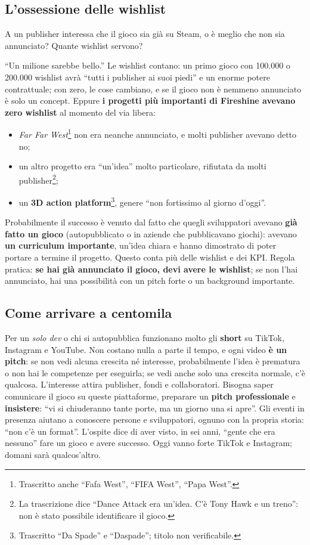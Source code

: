 \subsection{L'ossessione delle wishlist}

A un publisher interessa che il gioco sia già su Steam, o è meglio che non sia
annunciato? Quante wishlist servono?

``Un milione sarebbe bello.'' Le wishlist contano: un primo gioco con 100.000 o
200.000 wishlist avrà ``tutti i publisher ai suoi piedi'' e un enorme potere
contrattuale; con zero, le cose cambiano, e se il gioco non è nemmeno annunciato è
solo un concept. Eppure \textbf{i progetti più importanti di Fireshine avevano zero
wishlist} al momento del via libera:
\begin{itemize}
  \item \emph{Far Far West}\footnote{Trascritto anche ``Fafa West'', ``FIFA
        West'', ``Papa West''.} non era neanche annunciato, e molti publisher
        avevano detto no;
  \item un altro progetto era ``un'idea'' molto particolare, rifiutata da molti
        publisher\footnote{La trascrizione dice ``Dance Attack era un'idea. C'è Tony
        Hawk e un treno'': non è stato possibile identificare il gioco.};
  \item un \textbf{3D action platform}\footnote{Trascritto ``Da Spade'' e
        ``Daspade''; titolo non verificabile.}, genere ``non fortissimo al giorno
        d'oggi''.
\end{itemize}
Probabilmente il successo è venuto dal fatto che quegli sviluppatori avevano
\textbf{già fatto un gioco} (autopubblicato o in aziende che pubblicavano giochi):
avevano \textbf{un curriculum importante}, un'idea chiara e hanno dimostrato di
poter portare a termine il progetto. Questo conta più delle wishlist e dei KPI.
Regola pratica: \textbf{se hai già annunciato il gioco, devi avere le wishlist};
se non l'hai annunciato, hai una possibilità con un pitch forte o un background
importante.

\subsection{Come arrivare a centomila}

Per un \emph{solo dev} o chi si autopubblica funzionano molto gli \textbf{short}
su TikTok, Instagram e YouTube. Non costano nulla a parte il tempo, e ogni video
\textbf{è un pitch}: se non vedi alcuna crescita né interesse, probabilmente
l'idea è prematura o non hai le competenze per eseguirla; se vedi anche solo una
crescita normale, c'è qualcosa. L'interesse attira publisher, fondi e
collaboratori. Bisogna saper comunicare il gioco su queste piattaforme, preparare
un \textbf{pitch professionale} e \textbf{insistere}: ``vi si chiuderanno tante
porte, ma un giorno una si apre''. Gli eventi in presenza aiutano a conoscere
persone e sviluppatori, ognuno con la propria storia: ``non c'è un format''.
L'ospite dice di aver visto, in sei anni, ``gente che era nessuno'' fare un gioco
e avere successo. Oggi vanno forte TikTok e Instagram; domani sarà
qualcos'altro.

